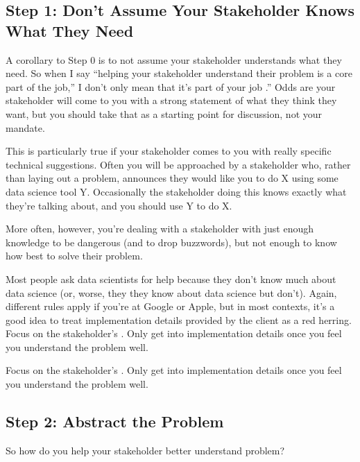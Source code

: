 \documentclass[letterpaper,10pt,english]{jupyterBook}
\begin{document}
\subsection{Step 1: Don’t Assume Your Stakeholder Knows What They Need}
\label{\detokenize{10_introduction/30_solving_the_right_problem:step-1-don-t-assume-your-stakeholder-knows-what-they-need}}
\sphinxAtStartPar
A corollary to Step 0 is to not assume your stakeholder understands what they need. So when I say “helping your stakeholder understand their problem is a core part of the job,” I don’t only mean that it’s part of your job .” Odds are your stakeholder will come to you with a strong statement of what they think they want, but you should take that as a starting point for discussion, not your mandate.

\sphinxAtStartPar
This is particularly true if your stakeholder comes to you with really specific technical suggestions. Often you will be approached by a stakeholder who, rather than laying out a problem, announces they would like you to do X using some data science tool Y. Occasionally the stakeholder doing this knows exactly what they’re talking about, and you should use Y to do X.

\sphinxAtStartPar
More often, however, you’re dealing with a stakeholder with just enough knowledge to be dangerous (and to drop buzzwords), but not enough to know how best to solve their problem.

\sphinxAtStartPar
Most people ask data scientists for help because they don’t know much about data science (or, worse, they  they know about data science but don’t). Again, different rules apply if you’re at Google or Apple, but in most contexts, it’s a good idea to treat implementation details provided by the client as a red herring. Focus on the stakeholder’s . Only get into implementation details once you feel you understand the problem well.

\begin{sphinxShadowBox}

\sphinxAtStartPar
Focus on the stakeholder’s . Only get into implementation details once you feel you understand the problem well.
\end{sphinxShadowBox}


\subsection{Step 2: Abstract the Problem}
\label{\detokenize{10_introduction/30_solving_the_right_problem:step-2-abstract-the-problem}}
\sphinxAtStartPar
So how do you help your stakeholder better understand  problem?
\end{document}
